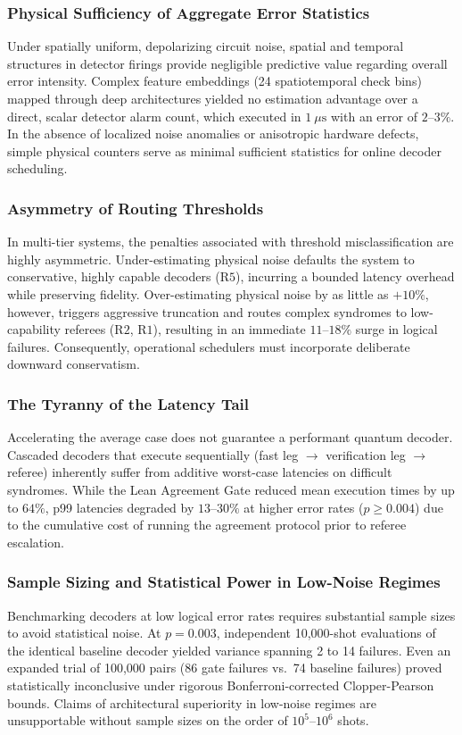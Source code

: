\subsubsection{Physical Sufficiency of Aggregate Error Statistics}
Under spatially uniform, depolarizing circuit noise, spatial and temporal structures in detector firings provide negligible predictive value regarding overall error intensity. Complex feature embeddings (24 spatiotemporal check bins) mapped through deep architectures yielded no estimation advantage over a direct, scalar detector alarm count, which executed in $1\ \mu\text{s}$ with an error of $2\text{--}3\%$. In the absence of localized noise anomalies or anisotropic hardware defects, simple physical counters serve as minimal sufficient statistics for online decoder scheduling.

\subsubsection{Asymmetry of Routing Thresholds}
In multi-tier systems, the penalties associated with threshold misclassification are highly asymmetric. Under-estimating physical noise defaults the system to conservative, highly capable decoders ($\text{R5}$), incurring a bounded latency overhead while preserving fidelity. Over-estimating physical noise by as little as $+10\%$, however, triggers aggressive truncation and routes complex syndromes to low-capability referees ($\text{R2}$, $\text{R1}$), resulting in an immediate $11\text{--}18\%$ surge in logical failures. Consequently, operational schedulers must incorporate deliberate downward conservatism.

\subsubsection{The Tyranny of the Latency Tail}
Accelerating the average case does not guarantee a performant quantum decoder. Cascaded decoders that execute sequentially (fast leg $\to$ verification leg $\to$ referee) inherently suffer from additive worst-case latencies on difficult syndromes. While the Lean Agreement Gate reduced mean execution times by up to $64\%$, p99 latencies degraded by $13\text{--}30\%$ at higher error rates ($p \ge 0.004$) due to the cumulative cost of running the agreement protocol prior to referee escalation.

\subsubsection{Sample Sizing and Statistical Power in Low-Noise Regimes}
Benchmarking decoders at low logical error rates requires substantial sample sizes to avoid statistical noise. At $p = 0.003$, independent 10,000-shot evaluations of the identical baseline decoder yielded variance spanning 2 to 14 failures. Even an expanded trial of 100,000 pairs (86 gate failures vs.\ 74 baseline failures) proved statistically inconclusive under rigorous Bonferroni-corrected Clopper-Pearson bounds. Claims of architectural superiority in low-noise regimes are unsupportable without sample sizes on the order of $10^5\text{--}10^6$ shots.

